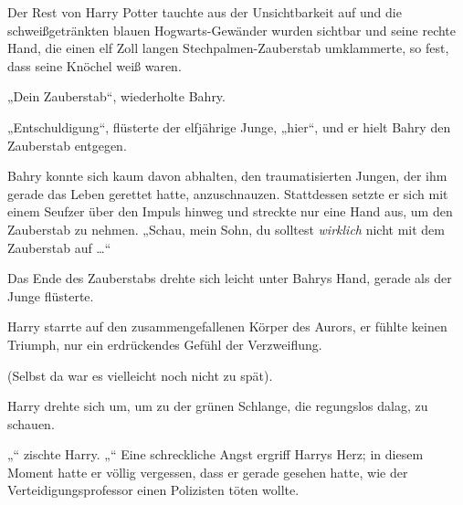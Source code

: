 Der Rest von Harry Potter tauchte aus der Unsichtbarkeit auf und die schweißgetränkten blauen Hogwarts-Gewänder wurden sichtbar und seine rechte Hand, die einen elf Zoll langen Stechpalmen-Zauberstab umklammerte, so fest, dass seine Knöchel weiß waren.

„Dein Zauberstab“, wiederholte Bahry.

„Entschuldigung“, flüsterte der elfjährige Junge, „hier“, und er hielt Bahry den Zauberstab entgegen.

Bahry konnte sich kaum davon abhalten, den traumatisierten Jungen, der ihm gerade das Leben gerettet hatte, anzuschnauzen. Stattdessen setzte er sich mit einem Seufzer über den Impuls hinweg und streckte nur eine Hand aus, um den Zauberstab zu nehmen.
„Schau, mein Sohn, du solltest \emph{wirklich} nicht mit dem Zauberstab auf …“

Das Ende des Zauberstabs drehte sich leicht unter Bahrys Hand, gerade als der Junge  flüsterte.

\later

Harry starrte auf den zusammengefallenen Körper des Aurors, er fühlte keinen Triumph, nur ein erdrückendes Gefühl der Verzweiflung.

(Selbst da war es vielleicht noch nicht zu spät).

Harry drehte sich um, um zu der grünen Schlange, die regungslos dalag, zu schauen.

„“ zischte Harry. „“ Eine schreckliche Angst ergriff Harrys Herz; in diesem Moment hatte er völlig vergessen, dass er gerade gesehen hatte, wie der Verteidigungsprofessor einen Polizisten töten wollte.


